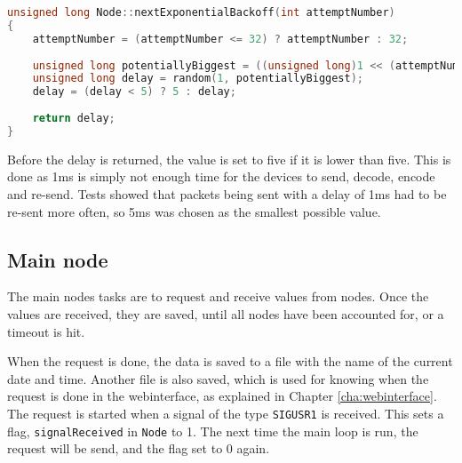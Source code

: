 \begin{lstlisting}[language=C,caption={Exponential backoff on the sensor nodes. In Node.cpp.},label={lst:expbackoff}]
unsigned long Node::nextExponentialBackoff(int attemptNumber)
{
    attemptNumber = (attemptNumber <= 32) ? attemptNumber : 32;
    
    unsigned long potentiallyBiggest = ((unsigned long)1 << (attemptNumber - 1));
    unsigned long delay = random(1, potentiallyBiggest);
    delay = (delay < 5) ? 5 : delay;
    
    return delay;
}
\end{lstlisting}

Before the delay is returned, the value is set to five if it is lower than five. This is done as 1ms is simply not enough time for the devices to send, decode, encode and re-send. Tests showed that packets being sent with a delay of 1ms had to be re-sent more often, so 5ms was chosen as the smallest possible value.



\subsection{Main node} \label{cha:signalhandling}
The main nodes tasks are to request and receive values from nodes. Once the values are received, they are saved, until all nodes have been accounted for, or a timeout is hit.

When the request is done, the data is saved to a file with the name of the current date and time. Another file is also saved, which is used for knowing when the request is done in the webinterface, as explained in Chapter \ref{cha:webinterface}. The request is started when a signal of the type \texttt{SIGUSR1} is received. This sets a flag, \texttt{signalReceived} in \texttt{Node} to 1. The next time the main loop is run, the request will be send, and the flag set to 0 again.